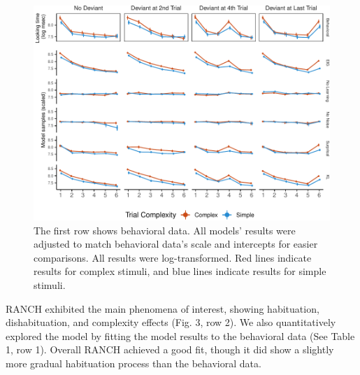\documentclass[10pt, letterpaper]{article}
\newenvironment{CodeChunk}{}{}
\begin{document}
\begin{CodeChunk}
\begin{figure}[t!]

{\centering \includegraphics{figs/experiment_res-1} 

}

\caption[The first row shows behavioral data]{The first row shows behavioral data. All models’ results were adjusted to match behavioral data’s scale and intercepts for easier comparisons. All results were log-transformed. Red lines indicate results for complex stimuli, and blue lines indicate results for simple stimuli.}\label{fig:experiment_res}
\end{figure}
\end{CodeChunk}

RANCH exhibited the main phenomena of interest, showing habituation,
dishabituation, and complexity effects (Fig. 3, row 2). We also
quantitatively explored the model by fitting the model results to the
behavioral data (See Table 1, row 1). Overall RANCH achieved a good fit,
though it did show a slightly more gradual habituation process than the
behavioral data.
\end{document}
